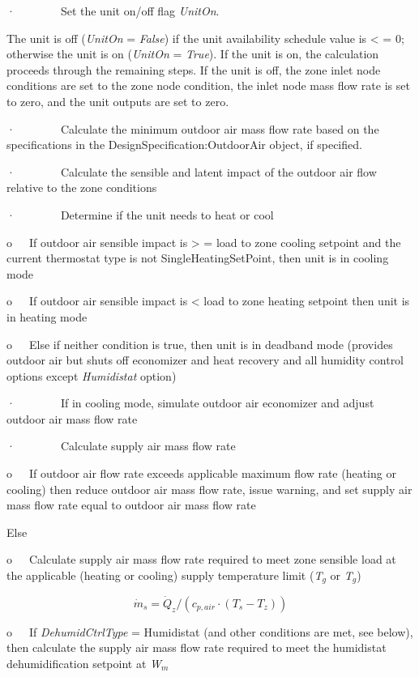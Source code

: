 ·~~~~~~~~Set the unit on/off flag \emph{UnitOn}.

The unit is off (\emph{UnitOn} = \emph{False}) if the unit availability schedule value is \textless{} = 0; otherwise the unit is on (\emph{UnitOn} = \emph{True}). If the unit is on, the calculation proceeds through the remaining steps. If the unit is off, the zone inlet node conditions are set to the zone node condition, the inlet node mass flow rate is set to zero, and the unit outputs are set to zero.

·~~~~~~~~Calculate the minimum outdoor air mass flow rate based on the specifications in the DesignSpecification:OutdoorAir object, if specified.

·~~~~~~~~Calculate the sensible and latent impact of the outdoor air flow relative to the zone conditions

·~~~~~~~~Determine if the unit needs to heat or cool

o~~~If outdoor air sensible impact is \textgreater{} = load to zone cooling setpoint and the current thermostat type is not SingleHeatingSetPoint, then unit is in cooling mode

o~~~If outdoor air sensible impact is \textless{} load to zone heating setpoint then unit is in heating mode

o~~~Else if neither condition is true, then unit is in deadband mode (provides outdoor air but shuts off economizer and heat recovery and all humidity control options except \emph{Humidistat} option)

·~~~~~~~~If in cooling mode, simulate outdoor air economizer and adjust outdoor air mass flow rate

·~~~~~~~~Calculate supply air mass flow rate

o~~~If outdoor air flow rate exceeds applicable maximum flow rate (heating or cooling) then reduce outdoor air mass flow rate, issue warning, and set supply air mass flow rate equal to outdoor air mass flow rate

Else

o~~~Calculate supply air mass flow rate required to meet zone sensible load at the applicable (heating or cooling) supply temperature limit (\emph{T\(_{g}\)} or \emph{T\(_{g}\)})

\begin{equation}
{\dot m_s} = {\dot Q_z}/({c_{p,air}}\cdot ({T_s} - {T_z}))
\end{equation}

o~~~If \emph{DehumidCtrlType} = Humidistat (and other conditions are met, see below), then calculate the supply air mass flow rate required to meet the humidistat dehumidification setpoint at \emph{W\(_{m}\)}

